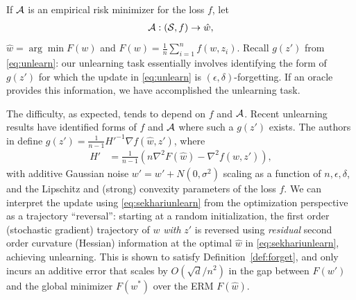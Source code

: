 If $\mathcal{A}$ is an empirical risk minimizer for the loss $f$, let
\begin{align}
    \cA : (\cS, f) \rightarrow \hat{w},%
\end{align}
$\hat{w} = \arg\min F(w)$ and $F(w) = \frac{1}{n}\sum_{i=1}^n f(w, z_i).$ 
Recall $g(z')$ from \eqref{eq:unlearn}:  
our unlearning task 
essentially involves 
identifying 
the form of $g(z')$ for which the update in \eqref{eq:unlearn} is $(\epsilon,\delta)$-forgetting. If an oracle provides this information, we have 
accomplished the unlearning task.

The difficulty, 
as expected, tends to 
depend on $f$ and $\mathcal{A}$. 
Recent unlearning results have identified forms of $f$ and $\mathcal{A}$ where such a $g(z')$ exists. The authors in \cite{sekhari2021remember} define $g(z') = \frac{1}{n-1}H'^{-1}\nabla f(\hat{w},z')$, where
\begin{align}\label{eq:sekhariunlearn}
    H' &= \frac{1}{n-1} \left(n\nabla^2 F(\hat{w}) - \nabla^2 f(\hat{w},z')\right),
\end{align}
with additive Gaussian noise $w' = w' + N(0,\sigma^2)$ scaling as a function of $n, \epsilon, \delta$, and the Lipschitz and (strong) convexity parameters of the loss $f$. We can interpret the update using \eqref{eq:sekhariunlearn} from the optimization perspective as a trajectory ``reversal'': starting at a random initialization, the first order (stochastic gradient) trajectory of  ${w}$ {\em with}  $z'$ is reversed using {\em residual} second order curvature (Hessian) information at the optimal $\hat{w}$ in \eqref{eq:sekhariunlearn}, achieving unlearning. This is shown to satisfy Definition~\ref{def:forget}, and only incurs an additive error that scales by $O(\sqrt{d}/n^2)$ in the gap between $F(w')$ and the global minimizer $F(w^*)$ over the ERM $F(\hat{w})$. 

